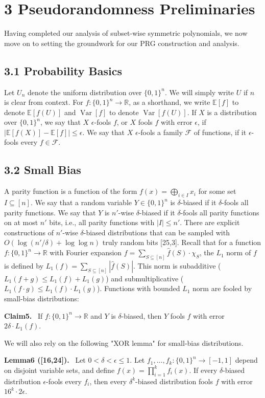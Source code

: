 \documentclass[10pt,a4paper]{article}
\newenvironment{authorclaim}[1]{\par\medskip\noindent\textbf{#1.}\ \ignorespaces}{\par\medskip}
\begin{document}
\section*{3 Pseudorandomness Preliminaries}
Having completed our analysis of subset-wise symmetric polynomials, we now move on to setting the groundwork for our PRG construction and analysis.
\subsection*{3.1 Probability Basics}
Let $U_n$ denote the uniform distribution over $\{0,1\}^n$. We will simply write $U$ if $n$ is clear from context. For $f:\{0,1\}^n\to\mathbb R$, as a shorthand, we write $\mathbb E[f]$ to denote $\mathbb E[f(U)]$ and $\operatorname{Var}[f]$ to denote $\operatorname{Var}[f(U)]$. If $X$ is a distribution over $\{0,1\}^n$, we say that $X$ $\epsilon$-fools $f$, or $X$ fools $f$ with error $\epsilon$, if $|\mathbb E[f(X)]-\mathbb E[f]|\le\epsilon$. We say that $X$ $\epsilon$-fools a family $\mathcal F$ of functions, if it $\epsilon$-fools every $f\in\mathcal F$.
\subsection*{3.2 Small Bias}
A parity function is a function of the form $f(x)=\bigoplus_{i\in I}x_i$ for some set $I\subseteq[n]$. We say that a random variable $Y\in\{0,1\}^n$ is $\delta$-biased if it $\delta$-fools all parity functions. We say that $Y$ is $n'$-wise $\delta$-biased if it $\delta$-fools all parity functions on at most $n'$ bits, i.e., all parity functions with $|I|\le n'$. There are explicit constructions of $n'$-wise $\delta$-biased distributions that can be sampled with $O(\log(n'/\delta)+\log\log n)$ truly random bits [25,3].
Recall that for a function $f:\{0,1\}^n\to\mathbb R$ with Fourier expansion $f=\sum_{S\subseteq[n]}\widehat f(S)\cdot\chi_S$, the $L_1$ norm of $f$ is defined by $L_1(f)=\sum_{S\subseteq[n]}|\widehat f(S)|$. This norm is subadditive ($L_1(f+g)\le L_1(f)+L_1(g)$) and submultiplicative ($L_1(f\cdot g)\le L_1(f)\cdot L_1(g)$). Functions with bounded $L_1$ norm are fooled by small-bias distributions:
\begin{authorclaim}{Claim5}
If $f:\{0,1\}^n\to\mathbb R$ and $Y$ is $\delta$-biased, then $Y$ fools $f$ with error $2\delta\cdot L_1(f)$.
\end{authorclaim}
We will also rely on the following "XOR lemma" for small-bias distributions.
\begin{authorclaim}{Lemma6 ([16,24])}
Let $0<\delta<\epsilon\le1$. Let $f_1,\ldots,f_k:\{0,1\}^n\to[-1,1]$ depend on disjoint variable sets, and define $f(x)=\prod_{i=1}^kf_i(x)$. If every $\delta$-biased distribution $\epsilon$-fools every $f_i$, then every $\delta^k$-biased distribution fools $f$ with error $16^k\cdot2\epsilon$.
\end{authorclaim}
\end{document}
